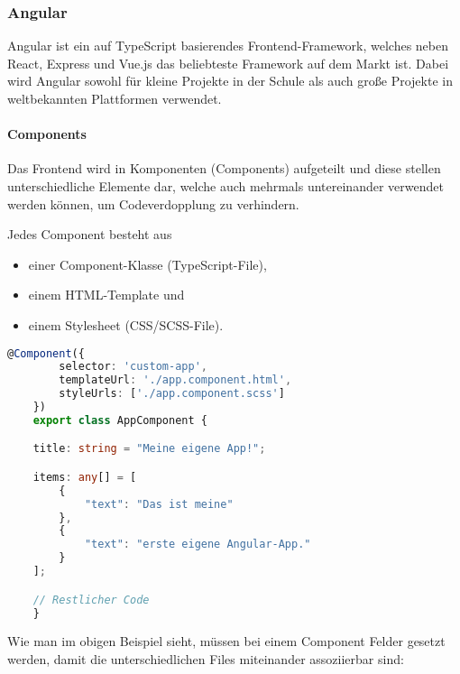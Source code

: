 \subsubsection{Angular}

Angular ist ein auf TypeScript basierendes Frontend-Framework, welches neben React, Express und Vue.js das beliebteste Framework auf dem Markt ist. \cite{SFT} Dabei wird Angular sowohl für kleine Projekte in der Schule als auch große Projekte in weltbekannten Plattformen verwendet.

\paragraph{Components}

Das Frontend wird in Komponenten (Components) aufgeteilt und diese stellen unterschiedliche Elemente dar, welche auch mehrmals untereinander verwendet werden können, um Codeverdopplung zu verhindern.

Jedes Component besteht aus

\begin{itemize}
    \item einer Component-Klasse (TypeScript-File),
    \item einem HTML-Template und
    \item einem Stylesheet (CSS/SCSS-File).
\end{itemize}

\begin{minipage}{\linewidth}
\begin{lstlisting}[language=TypeScript,caption={Beispiel eines Angular-Components}]
    @Component({
        selector: 'custom-app',
        templateUrl: './app.component.html',
        styleUrls: ['./app.component.scss']
    })
    export class AppComponent {

    title: string = "Meine eigene App!";

    items: any[] = [
        {
            "text": "Das ist meine"
        },
        {
            "text": "erste eigene Angular-App."
        }
    ];

    // Restlicher Code
    }
\end{lstlisting}
\end{minipage}

Wie man im obigen Beispiel sieht, müssen bei einem Component Felder gesetzt werden, damit die unterschiedlichen Files miteinander assoziierbar sind:

